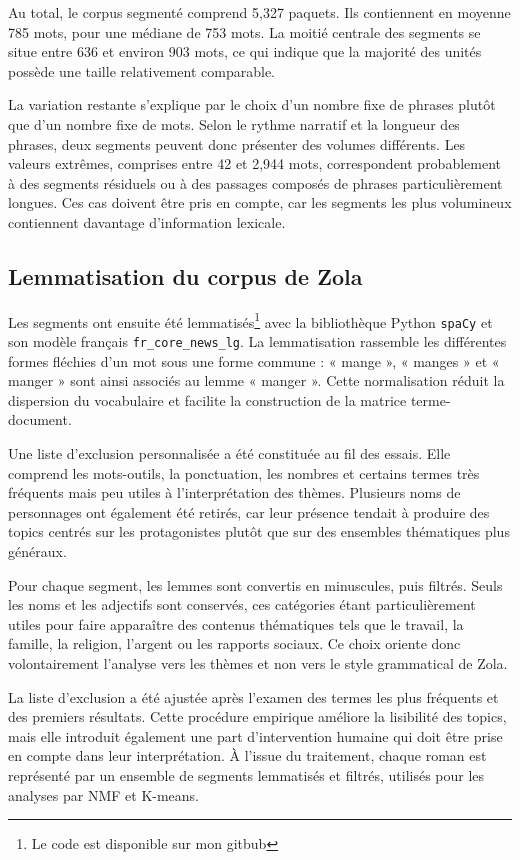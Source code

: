 Au total, le corpus segmenté comprend 5,327 paquets. Ils contiennent en moyenne 785 mots, pour une médiane de 753 mots. La moitié centrale des segments se situe entre 636 et environ 903 mots, ce qui indique que la majorité des unités possède une taille relativement comparable.

La variation restante s'explique par le choix d'un nombre fixe de phrases plutôt que d'un nombre fixe de mots. Selon le rythme narratif et la longueur des phrases, deux segments peuvent donc présenter des volumes différents. Les valeurs extrêmes, comprises entre 42 et 2,944 mots, correspondent probablement à des segments résiduels ou à des passages composés de phrases particulièrement longues. Ces cas doivent être pris en compte, car les segments les plus volumineux contiennent davantage d'information lexicale.


\subsection{Lemmatisation du corpus de Zola}

Les segments ont ensuite été lemmatisés\footnote{Le code est disponible sur mon gitbub} avec la bibliothèque Python \texttt{spaCy} et son modèle français \texttt{fr\_core\_news\_lg}. La lemmatisation rassemble les différentes formes fléchies d'un mot sous une forme commune : « mange », « manges » et « manger » sont ainsi associés au lemme « manger ». Cette normalisation réduit la dispersion du vocabulaire et facilite la construction de la matrice terme-document.

Une liste d'exclusion personnalisée a été constituée au fil des essais. Elle comprend les mots-outils, la ponctuation, les nombres et certains termes très fréquents mais peu utiles à l'interprétation des thèmes. Plusieurs noms de personnages ont également été retirés, car leur présence tendait à produire des topics centrés sur les protagonistes plutôt que sur des ensembles thématiques plus généraux.

Pour chaque segment, les lemmes sont convertis en minuscules, puis filtrés. Seuls les noms et les adjectifs sont conservés, ces catégories étant particulièrement utiles pour faire apparaître des contenus thématiques tels que le travail, la famille, la religion, l'argent ou les rapports sociaux. Ce choix oriente donc volontairement l'analyse vers les thèmes et non vers le style grammatical de Zola.

La liste d'exclusion a été ajustée après l'examen des termes les plus fréquents et des premiers résultats. Cette procédure empirique améliore la lisibilité des topics, mais elle introduit également une part d'intervention humaine qui doit être prise en compte dans leur interprétation. À l'issue du traitement, chaque roman est représenté par un ensemble de segments lemmatisés et filtrés, utilisés pour les analyses par NMF et K-means.
